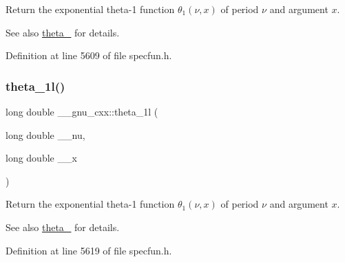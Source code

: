 Return the exponential theta-\/1 function $ \theta_1(\nu,x) $ of period $ \nu $ and argument $ x $.

\begin{DoxySeeAlso}{See also}
\hyperlink{group__gnu__math__spec__func_gaa2e5a3a5f550fe032a596a8b01c878c0}{theta\+\_} for details. 
\end{DoxySeeAlso}


Definition at line 5609 of file specfun.\+h.

\mbox{\label{group__gnu__math__spec__func_ga3520684c78771ffa57180060c8b6d1ca}} 
\subsubsection{\texorpdfstring{theta\+\_\+1l()}{theta\_1l()}}
{\footnotesize\ttfamily long double \+\_\+\+\_\+gnu\+\_\+cxx\+::theta\+\_\+1l (\begin{DoxyParamCaption}\item[{long double}]{\+\_\+\+\_\+nu,  }\item[{long double}]{\+\_\+\+\_\+x }\end{DoxyParamCaption})\hspace{0.3cm}{\ttfamily [inline]}}

Return the exponential theta-\/1 function $ \theta_1(\nu,x) $ of period $ \nu $ and argument $ x $.

\begin{DoxySeeAlso}{See also}
\hyperlink{group__gnu__math__spec__func_gaa2e5a3a5f550fe032a596a8b01c878c0}{theta\+\_} for details. 
\end{DoxySeeAlso}


Definition at line 5619 of file specfun.\+h.

\mbox{\label{group__gnu__math__spec__func_ga16f278edeb2842d614bae1f1ae2d0256}} 
